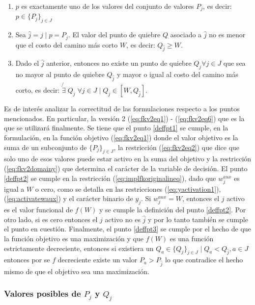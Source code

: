 \documentclass{article}
\begin{document}
  \begin{enumerate}
    \item {\label{deffpt1} $p$ es exactamente uno de los valores del conjunto de valores $P_j$, es decir: $p \in \{P_j\}_{j \in J}$}
    \item {\label{deffpt2} Sea $\hat{j} = j \;|\; p = P_j$. El valor del punto de quiebre $Q$ asociado a $\hat{j}$ no es menor que el costo del camino más corto $W$, es decir: $Q_{\hat{j}} \geq W$.}
    \item {\label{deffpt3} Dado el $\hat{j}$ anterior, entonces no existe un punto de quiebre $Q_j \forall j \in J$ que sea no mayor al punto de quiebre $Q_{\hat{j}}$ y mayor o igual al costo del camino más corto, es decir: $\not{\exists}\; Q_j\; \forall j \in J \;|\; Q_j \in  [W, Q_{\hat{j}}]$}.
  \end{enumerate}

  Es de interés analizar la correctitud de las formulaciones respecto a los puntos mencionados. En particular, la versión 2 (\ref{eq:fkv2eq1}) - (\ref{eq:fkv2eq6}) que es la que se utilizará finalmente. Se tiene que el punto \ref{deffpt1} se cumple, en la formulación, en la función objetivo (\ref{eq:fkv2eq1}) donde el valor objetivo es la suma de un subconjunto de $\{P_j\}_{j \in J}$, la restricción (\ref{eq:fkv2eq2}) que dice que solo uno de esos valores puede estar activo en la suma del objetivo y la restricción (\ref{eq:fkv2domainy}) que determina el carácter de la variable de decisión. El punto \ref{deffpt2} se cumple en la restricción (\ref{eq:implfkoriginalineq}), dado que $w^{aux}_j$ es igual a $W$ o cero, como se detalla en las restricciones (\ref{eq:yactivation1}), (\ref{eq:activatewaux}) y el carácter binario de $y_j$. Si $w^{aux}_j = W$, entonces el $j$ activo es el valor funcional de $f(W)$ y se cumple la definición del punto \ref{deffpt2}. Por otro lado, si es cero entonces el $j$ activo no es $\hat{j}$ y por lo tanto también se cumple el punto en cuestión. Finalmente, el punto \ref{deffpt3} se cumple por el hecho de que la función objetivo es una maximización y que $f(W)$ es una función estrictamente decreciente, entonces si existiera un $Q_a \in \{Q_j\}_{j \in J} \;|\; Q_a < Q_{\hat{j}}, a \in J$ entonces por se $f$ decreciente existe un valor $P_a > P_{\hat{j}}$ lo que contradice el hecho mismo de que el objetivo sea una maximización.

  \subsubsection*{Valores posibles de $P_j$ y $Q_j$}
\end{document}
